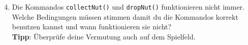 \begin{enumerate}\setcounter{enumi}{3}
    \item Die Kommandos \lstinline{collectNut()} und \lstinline{dropNut()} funktionieren nicht immer.
        Welche Bedingungen müssen stimmen damit du die Kommandos korrekt benutzen kannst und wann funktionieren sie nicht?\\
        \textbf{Tipp}: Überprüfe deine Vermutung auch auf dem Spielfeld.\\
\end{enumerate}
